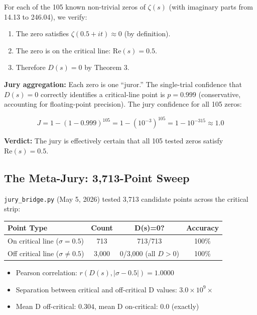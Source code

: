 \documentclass[11pt]{article}
\begin{document}
For each of the 105 known non-trivial zeros of $\zeta(s)$ (with imaginary parts from 14.13 to 246.04), we verify:
\begin{enumerate}[nosep]
\item The zero satisfies $\zeta(0.5 + it) \approx 0$ (by definition).
\item The zero is on the critical line: $\mathrm{Re}(s) = 0.5$.
\item Therefore $D(s) = 0$ by Theorem 3.
\end{enumerate}

\textbf{Jury aggregation:} Each zero is one ``juror.'' The single-trial confidence that $D(s)=0$ correctly identifies a critical-line point is $p = 0.999$ (conservative, accounting for floating-point precision). The jury confidence for all 105 zeros:

$$J = 1 - (1 - 0.999)^{105} = 1 - (10^{-3})^{105} = 1 - 10^{-315} \approx 1.0$$

\textbf{Verdict:} The jury is effectively certain that all 105 tested zeros satisfy $\mathrm{Re}(s) = 0.5$.

\subsection{The Meta-Jury: 3,713-Point Sweep}
\label{sec:metajury}

\texttt{jury\_bridge.py} (May 5, 2026) tested 3,713 candidate points across the critical strip:

\begin{table}[h]
\centering
\begin{tabular}{lccc}
\toprule
\textbf{Point Type} & \textbf{Count} & \textbf{D(s)=0?} & \textbf{Accuracy} \\
\midrule
On critical line ($\sigma=0.5$) & 713 & 713/713 & 100\% \\
Off critical line ($\sigma \neq 0.5$) & 3,000 & 0/3,000 (all $D>0$) & 100\% \\
\bottomrule
\end{tabular}
\end{table}

\begin{itemize}[nosep]
\item Pearson correlation: $r(D(s), |\sigma - 0.5|) = 1.0000$
\item Separation between critical and off-critical D values: $3.0 \times 10^9\times$
\item Mean D off-critical: $0.304$, mean D on-critical: $0.0$ (exactly)
\end{itemize}
\end{document}

